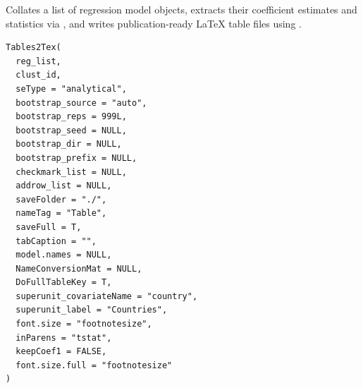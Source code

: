 \documentclass[a4paper]{book}
\begin{document}
%
\begin{Description}
Collates a list of regression model objects, extracts their coefficient
estimates and statistics via , and writes
publication-ready LaTeX table files using .
\end{Description}
%
\begin{Usage}
\begin{verbatim}
Tables2Tex(
  reg_list,
  clust_id,
  seType = "analytical",
  bootstrap_source = "auto",
  bootstrap_reps = 999L,
  bootstrap_seed = NULL,
  bootstrap_dir = NULL,
  bootstrap_prefix = NULL,
  checkmark_list = NULL,
  addrow_list = NULL,
  saveFolder = "./",
  nameTag = "Table",
  saveFull = T,
  tabCaption = "",
  model.names = NULL,
  NameConversionMat = NULL,
  DoFullTableKey = T,
  superunit_covariateName = "country",
  superunit_label = "Countries",
  font.size = "footnotesize",
  inParens = "tstat",
  keepCoef1 = FALSE,
  font.size.full = "footnotesize"
)
\end{verbatim}
\end{Usage}
%
\end{document}
